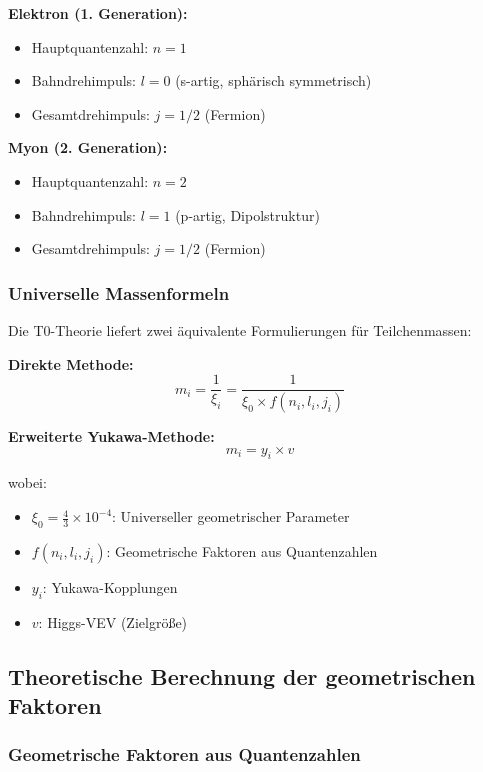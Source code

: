 \documentclass[12pt,a4paper]{article}
\begin{document}
\textbf{Elektron (1. Generation):}
\begin{itemize}
	\item Hauptquantenzahl: $n = 1$
	\item Bahndrehimpuls: $l = 0$ (s-artig, sphärisch symmetrisch)
	\item Gesamtdrehimpuls: $j = 1/2$ (Fermion)
\end{itemize}

\textbf{Myon (2. Generation):}
\begin{itemize}
	\item Hauptquantenzahl: $n = 2$
	\item Bahndrehimpuls: $l = 1$ (p-artig, Dipolstruktur)
	\item Gesamtdrehimpuls: $j = 1/2$ (Fermion)
\end{itemize}

\subsubsection{Universelle Massenformeln}

Die T0-Theorie liefert zwei äquivalente Formulierungen für Teilchenmassen:

\textbf{Direkte Methode:}
\begin{equation}
	m_i = \frac{1}{\xi_i} = \frac{1}{\xi_0 \times f(n_i, l_i, j_i)}
	\label{eq:direct_mass_formula}
\end{equation}

\textbf{Erweiterte Yukawa-Methode:}
\begin{equation}
	m_i = y_i \times v
	\label{eq:yukawa_mass_formula}
\end{equation}

wobei:
\begin{itemize}
	\item $\xi_0 = \frac{4}{3} \times 10^{-4}$: Universeller geometrischer Parameter
	\item $f(n_i, l_i, j_i)$: Geometrische Faktoren aus Quantenzahlen
	\item $y_i$: Yukawa-Kopplungen
	\item $v$: Higgs-VEV (Zielgröße)
\end{itemize}

\subsection{Theoretische Berechnung der geometrischen Faktoren}

\subsubsection{Geometrische Faktoren aus Quantenzahlen}
\end{document}

